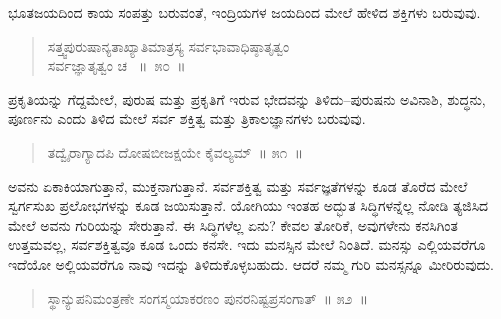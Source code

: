 \vspace{-0.3cm}


ಭೂತಜಯದಿಂದ ಕಾಯ ಸಂಪತ್ತು ಬರುವಂತೆ, ಇಂದ್ರಿಯಗಳ ಜಯದಿಂದ ಮೇಲೆ ಹೇಳಿದ ಶಕ್ತಿಗಳು ಬರುವುವು. 

\vspace{-0.3cm}

\begin{verse}
ಸತ್ತ್ವಪುರುಷಾನ್ಯತಾಖ್ಯಾತಿಮಾತ್ರಸ್ಯ ಸರ್ವಭಾವಾಧಿಷ್ಠಾತೃತ್ವಂ\\ ಸರ್ವಜ್ಞಾತೃತ್ವಂ ಚ~ \hfill{॥~೫೦~॥}
\end{verse}

\vspace{-0.3cm}


ಪ್ರಕೃತಿಯನ್ನು ಗೆದ್ದಮೇಲೆ, ಪುರುಷ ಮತ್ತು ಪ್ರಕೃತಿಗೆ ಇರುವ ಭೇದವನ್ನು ತಿಳಿದು–ಪುರುಷನು ಅವಿನಾಶಿ, ಶುದ್ಧನು, ಪೂರ್ಣನು ಎಂದು ತಿಳಿದ ಮೇಲೆ ಸರ್ವ ಶಕ್ತಿತ್ವ ಮತ್ತು ತ್ರಿಕಾಲಜ್ಞಾನಗಳು ಬರುವುವು. 

\vspace{-0.3cm}

\begin{verse}
ತದ್ವೈರಾಗ್ಯಾದಪಿ ದೋಷಬೀಜಕ್ಷಯೇ ಕೈವಲ್ಯಮ್​~॥ ೫೧~॥
\end{verse}

\vspace{-0.3cm}


ಅವನು ಏಕಾಕಿಯಾಗುತ್ತಾನೆ, ಮುಕ್ತನಾಗುತ್ತಾನೆ. ಸರ್ವಶಕ್ತಿತ್ವ ಮತ್ತು ಸರ್ವಜ್ಞತೆಗಳನ್ನು ಕೂಡ ತೊರೆದ ಮೇಲೆ ಸ್ವರ್ಗಸುಖ ಪ್ರಲೋಭಗಳನ್ನು ಕೂಡ ಜಯಿಸುತ್ತಾನೆ. ಯೋಗಿಯು ಇಂತಹ ಅದ್ಭುತ ಸಿದ್ಧಿಗಳನ್ನೆಲ್ಲ ನೋಡಿ ತ್ಯಜಿಸಿದ ಮೇಲೆ ಅವನು ಗುರಿಯನ್ನು ಸೇರುತ್ತಾನೆ. ಈ ಸಿದ್ಧಿಗಳೆಲ್ಲ ಏನು? ಕೇವಲ ತೋರಿಕೆ, ಅವುಗಳೇನು ಕನಸಿಗಿಂತ ಉತ್ತಮವಲ್ಲ, ಸರ್ವಶಕ್ತಿತ್ವವೂ ಕೂಡ ಒಂದು ಕನಸೇ. ಇದು ಮನಸ್ಸಿನ ಮೇಲೆ ನಿಂತಿದೆ. ಮನಸ್ಸು ಎಲ್ಲಿಯವರೆಗೂ ಇದೆಯೋ ಅಲ್ಲಿಯವರೆಗೂ ನಾವು ಇದನ್ನು ತಿಳಿದುಕೊಳ್ಳಬಹುದು. ಆದರೆ ನಮ್ಮ ಗುರಿ ಮನಸ್ಸನ್ನೂ ಮೀರಿರುವುದು. 

\vspace{-0.3cm}

\begin{verse}
ಸ್ಥಾನ್ಯುಪನಿಮಂತ್ರಣೇ ಸಂಗಸ್ಮಯಾಕರಣಂ ಪುನರನಿಷ್ಟಪ್ರಸಂಗಾತ್​~॥ ೫೨~॥
\end{verse}

\vspace{-0.3cm}


